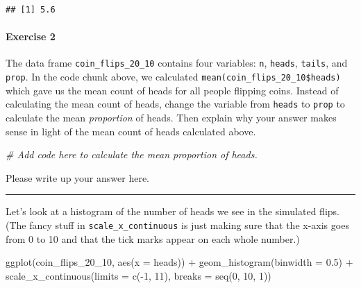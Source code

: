 \documentclass[
]{book}
\newenvironment{Shaded}{\begin{snugshade}}{\end{snugshade}}
\newcommand{\AttributeTok}[1]{\textcolor[rgb]{0.77,0.63,0.00}{#1}}
\newcommand{\CommentTok}[1]{\textcolor[rgb]{0.56,0.35,0.01}{\textit{#1}}}
\newcommand{\DecValTok}[1]{\textcolor[rgb]{0.00,0.00,0.81}{#1}}
\newcommand{\FloatTok}[1]{\textcolor[rgb]{0.00,0.00,0.81}{#1}}
\newcommand{\FunctionTok}[1]{\textcolor[rgb]{0.00,0.00,0.00}{#1}}
\newcommand{\NormalTok}[1]{#1}
\newcommand{\SpecialCharTok}[1]{\textcolor[rgb]{0.00,0.00,0.00}{#1}}
\begin{document}
\begin{verbatim}
## [1] 5.6
\end{verbatim}

\hypertarget{exercise-2-4}{%
\paragraph*{Exercise 2}\label{exercise-2-4}}

The data frame \texttt{coin\_flips\_20\_10} contains four variables: \texttt{n}, \texttt{heads}, \texttt{tails}, and \texttt{prop}. In the code chunk above, we calculated \texttt{mean(coin\_flips\_20\_10\$heads)} which gave us the mean count of heads for all people flipping coins. Instead of calculating the mean count of heads, change the variable from \texttt{heads} to \texttt{prop} to calculate the mean \emph{proportion} of heads. Then explain why your answer makes sense in light of the mean count of heads calculated above.

\begin{Shaded}
\begin{Highlighting}[]
\CommentTok{\# Add code here to calculate the mean proportion of heads.}
\end{Highlighting}
\end{Shaded}

Please write up your answer here.

\begin{center}\rule{0.5\linewidth}{0.5pt}\end{center}

Let's look at a histogram of the number of heads we see in the simulated flips. (The fancy stuff in \texttt{scale\_x\_continuous} is just making sure that the x-axis goes from 0 to 10 and that the tick marks appear on each whole number.)

\begin{Shaded}
\begin{Highlighting}[]
\FunctionTok{ggplot}\NormalTok{(coin\_flips\_20\_10, }\FunctionTok{aes}\NormalTok{(}\AttributeTok{x =}\NormalTok{ heads)) }\SpecialCharTok{+}
    \FunctionTok{geom\_histogram}\NormalTok{(}\AttributeTok{binwidth =} \FloatTok{0.5}\NormalTok{) }\SpecialCharTok{+}
    \FunctionTok{scale\_x\_continuous}\NormalTok{(}\AttributeTok{limits =} \FunctionTok{c}\NormalTok{(}\SpecialCharTok{{-}}\DecValTok{1}\NormalTok{, }\DecValTok{11}\NormalTok{), }\AttributeTok{breaks =} \FunctionTok{seq}\NormalTok{(}\DecValTok{0}\NormalTok{, }\DecValTok{10}\NormalTok{, }\DecValTok{1}\NormalTok{))}
\end{Highlighting}
\end{Shaded}
\end{document}
